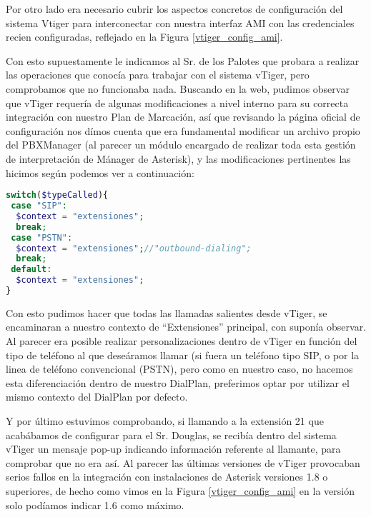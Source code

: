 
Por otro lado era necesario cubrir los aspectos concretos de configuración del sistema Vtiger para interconectar con nuestra interfaz AMI con las credenciales recien configuradas, reflejado en la Figura \ref{vtiger_config_ami}.


Con esto supuestamente le indicamos al Sr. de los Palotes que probara a realizar las operaciones que conocía para trabajar con el sistema vTiger, pero comprobamos que no funcionaba nada. Buscando en la web, pudimos observar que vTiger requería de algunas modificaciones a nivel interno para su correcta integración con nuestro Plan de Marcación, así que revisando la página oficial de configuración \cite{website:vtigerpbx} nos dímos cuenta que era fundamental modificar un archivo propio del PBXManager (al parecer un módulo encargado de realizar toda esta gestión de interpretación de Mánager de Asterisk), y las modificaciones pertinentes las hicimos según podemos ver a continuación:

\begin{lstlisting}[language=php,title={./www/vtigercrm/modules/PBXManager/utils/AsteriskClass.php}]
switch($typeCalled){
 case "SIP":
  $context = "extensiones";
  break;
 case "PSTN":
  $context = "extensiones";//"outbound-dialing";
  break;
 default:
  $context = "extensiones";
}
\end{lstlisting}

Con esto pudimos hacer que todas las llamadas salientes desde vTiger, se encaminaran a nuestro contexto de ``Extensiones'' principal, con suponía observar. Al parecer era posible realizar personalizaciones dentro de vTiger en función del tipo de teléfono al que deseáramos llamar (si fuera un teléfono tipo SIP, o por la linea de teléfono convencional (PSTN), pero como en nuestro caso, no hacemos esta diferenciación dentro de nuestro DialPlan, preferimos optar por utilizar el mismo contexto del DialPlan por defecto.

Y por último estuvimos comprobando, si llamando a la extensión 21 que acabábamos de configurar para el Sr. Douglas, se recibía dentro del sistema vTiger un mensaje pop-up indicando información referente al llamante, para comprobar que no era así. Al parecer las últimas versiones de vTiger provocaban serios fallos en la integración con instalaciones de Asterisk versiones 1.8 o superiores, de hecho como vimos en la Figura \ref{vtiger_config_ami} en la versión solo podíamos indicar 1.6 como máximo. 

